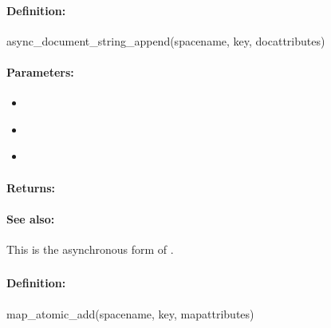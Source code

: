 \paragraph{Definition:}
\begin{rubycode}
async_document_string_append(spacename, key, docattributes)
\end{rubycode}

\paragraph{Parameters:}
\begin{itemize}[noitemsep]
\item {}\\

\item {}\\

\item {}\\

\end{itemize}

\paragraph{Returns:}


\paragraph{See also:}  This is the asynchronous form of .

\pagebreak
\subsubsection{}
\label{api:ruby:map_atomic_add}


\paragraph{Definition:}
\begin{rubycode}
map_atomic_add(spacename, key, mapattributes)
\end{rubycode}

